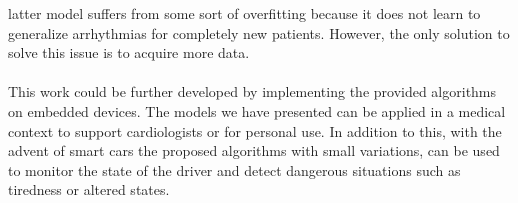 \documentclass[LaM,binding=0.6cm]{sapthesis}
\begin{document}
latter model suffers from some sort of overfitting because it does not learn to generalize arrhythmias for completely new patients. However, the only solution to solve this issue is to acquire more data.\\\\This work could be further developed by implementing the provided algorithms on embedded devices. The models we have presented can be applied in a medical context to support cardiologists or for personal use. In addition to this, with the advent of smart cars the proposed algorithms with small variations, can be used to monitor the state of the driver and detect dangerous situations such as tiredness or altered states.


\backmatter
\cleardoublepage
{}
\end{document}
